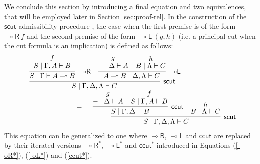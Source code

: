 \documentclass[sn-mathphys-num]{sn-jnl}%
\newcommand{\GG}{\Gamma}
\newcommand{\GD}{\Delta}
\newcommand{\GL}{\Lambda}
\newcommand{\vd}{\vdash}
\newcommand{\lolli}{\multimap}
\newcommand{\lleft}{{\lolli}\mathsf{L}}
\newcommand{\lright}{{\lolli}\mathsf{R}}
\newcommand{\proofbox}[1]{\begin{tabular}{l} #1 \end{tabular}}
\theoremstyle{thmstyleone}%
\theoremstyle{thmstyletwo}%
\theoremstyle{thmstylethree}%
\begin{document}
We conclude this section by introducing a final equation and two equivalences, that will be employed later in Section \ref{sec:proof-rel}.
In the construction of the $\mathsf{scut}$ admissibility procedure \cite{UVW:protsn,wan2024}, the case when the first premise is of the form $\lright\ f$ and the second premise of the form $\lleft\ (g,h)$ (i.e. a principal cut when the cut formula is an implication) is defined as follows:
\[
\begin{array}{l}
  \proofbox{
  \infer[\mathsf{scut}]{S \mid \GG,\GD,\GL \vd C}{
  \infer[\lright]{S \mid \GG \vd A \lolli B}{
  \deduce{S \mid \GG, A \vd B}{f}
  }
  &
  \infer[\lleft]{A \lolli B \mid \GD,\GL \vd C}{
  \deduce{{-} \mid \GD \vd A}{g}
  &
  \deduce{B \mid \GL \vd C}{h}
  }
  }
  }\\
  \qquad\qquad \qquad\qquad =
  \proofbox{
  \infer[\mathsf{scut}]{S \mid \GG,\GD,\GL \vd C}{
  \infer[\mathsf{ccut}]{S \mid \GG, \GD \vd B}{
  \deduce{{-} \mid \GD \vd A}{g}
  &
  \deduce{S \mid \GG, A \vd B}{f}
  }
  &
  \deduce{B \mid \GL \vd C}{h}
  }
  }
\end{array}
\]
This equation can be generalized to one where $\lright$, $\lleft$ and $\mathsf{ccut}$ are replaced by their iterated versions $\lright^*$, $\lleft^*$ and $\mathsf{ccut^*}$ introduced in Equations (\ref{-oR*}), (\ref{-oL*}) and (\ref{ccut*}). 
\end{document}
